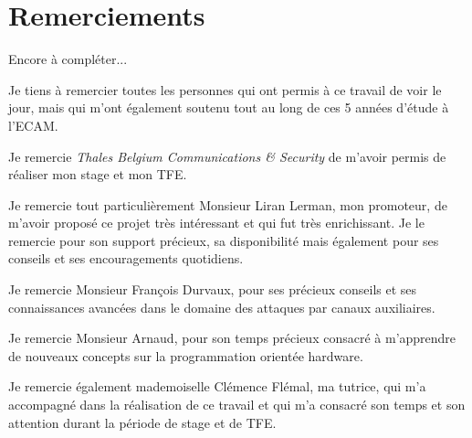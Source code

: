\documentclass[oneside]{book}
\begin{document}
\newpage
\strut
\thispagestyle{empty}
\newpage



\chapter*{Remerciements}

Encore à compléter...

Je tiens à remercier toutes les personnes qui ont permis à ce travail de voir le jour, mais qui m’ont également soutenu tout au long de ces 5 années d’étude à l’ECAM.

Je remercie \textit{Thales Belgium Communications \& Security} de m’avoir permis de réaliser mon stage et mon TFE.

Je remercie tout particulièrement Monsieur Liran Lerman, mon promoteur, de m’avoir proposé ce projet très intéressant et qui fut très enrichissant. Je le remercie pour son support précieux, sa disponibilité mais également pour ses conseils et ses encouragements quotidiens.

Je remercie Monsieur François Durvaux, pour ses précieux conseils et ses connaissances avancées dans le domaine des attaques par canaux auxiliaires.

Je remercie Monsieur Arnaud, pour son temps précieux consacré à m'apprendre de nouveaux concepts sur la programmation orientée hardware. 

Je remercie également mademoiselle Clémence Flémal, ma tutrice, qui m’a accompagné dans la réalisation de ce travail et qui m’a consacré son temps et son attention durant la période de stage et de TFE.

\newpage


{} %
\end{document}
